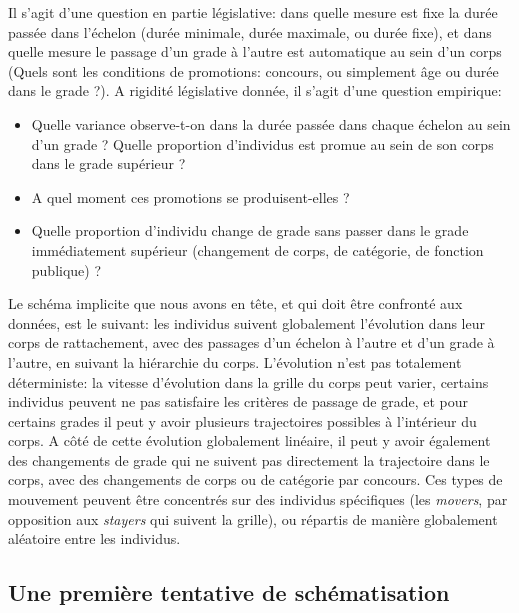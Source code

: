 \documentclass[11pt,a4paper]{article}
\begin{document}
Il s'agit d'une question en partie législative: dans quelle mesure est fixe la durée passée dans l'échelon (durée minimale, durée maximale, ou durée fixe), et dans quelle mesure le passage d'un grade à l'autre est automatique au sein d'un corps (Quels sont les conditions de promotions: concours, ou simplement âge ou durée dans le grade ?). A rigidité législative donnée, il s'agit d'une question empirique:
\begin{itemize}
    \item Quelle variance observe-t-on dans la durée passée dans chaque échelon au sein d'un grade ? Quelle proportion d'individus est promue au sein de son corps dans le grade supérieur ?
   \item A quel moment ces promotions se produisent-elles ? 
   \item Quelle proportion d'individu change de grade sans passer dans le grade immédiatement supérieur (changement de corps, de catégorie, de fonction publique) ?
\end{itemize}  

Le schéma implicite que nous avons en tête, et qui doit être confronté aux données, est le suivant: les individus suivent globalement l'évolution dans leur corps de rattachement, avec des passages d'un échelon à l'autre et d'un grade à l'autre, en suivant la hiérarchie du corps. L'évolution n'est pas totalement déterministe: la vitesse d'évolution dans la grille du corps peut varier, certains individus peuvent ne pas satisfaire les critères de passage de grade, et pour certains grades il peut y avoir plusieurs trajectoires possibles à l'intérieur du corps. A côté de cette évolution globalement linéaire, il peut y avoir également des changements de grade qui ne suivent pas directement la trajectoire dans le corps, avec des changements de corps ou de catégorie par concours. Ces types de mouvement peuvent être concentrés sur des individus spécifiques (les \textit{movers}, par opposition aux \textit{stayers} qui suivent la grille), ou répartis de manière globalement aléatoire entre les individus. 

\subsection*{Une première tentative de schématisation}
\end{document}
